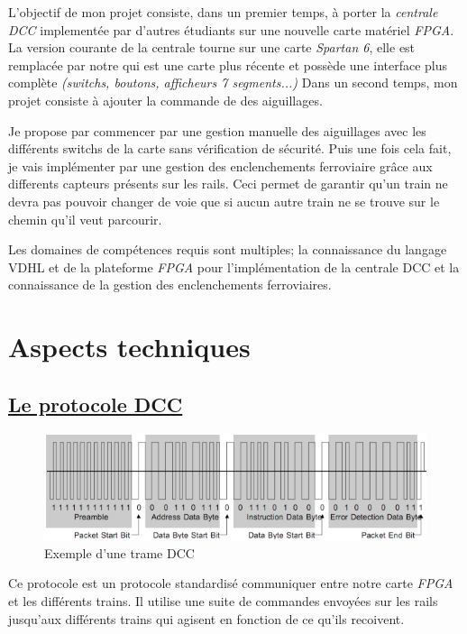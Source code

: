 L'objectif de mon projet consiste, dans un premier temps, à porter la
\emph{centrale DCC} implement\'ee par d'autres \'etudiants sur une nouvelle
carte mat\'eriel \emph{FPGA}. La version courante de la centrale tourne sur
une carte \emph{Spartan 6}, elle est remplac\'ee par notre \crt qui est
une carte plus r\'ecente et possède une interface plus complète
\emph{(switchs, boutons, afficheurs 7 segments...)}
Dans un second temps, mon projet consiste à ajouter la commande de
des aiguillages.

Je propose par commencer par une gestion manuelle des aiguillages avec
les diff\'erents switchs de la carte sans v\'erification de s\'ecurit\'e. Puis
une fois cela fait, je vais impl\'ementer par une gestion des
enclenchements ferroviaire grâce aux differents capteurs pr\'esents sur
les rails. Ceci permet de garantir qu'un train ne devra pas pouvoir
changer de voie que si aucun autre train ne se trouve sur le chemin
qu'il veut parcourir. 

Les domaines de comp\'etences requis sont multiples; la connaissance
du langage VDHL et de la plateforme \emph{FPGA} pour l'impl\'ementation
de la centrale DCC et la connaissance de la gestion des enclenchements
ferroviaires.


\newpage
\section{Aspects techniques}
\label{sec:asp_tech}

\subsection{\underline{ Le protocole DCC}}
\label{sec:dcc}


\begin{figure}[ht]
\centering
\includegraphics[scale=0.75]{trame.png}
\caption{Exemple d'une trame DCC}
\label{fig1}
\end{figure}


Ce protocole est un protocole standardis\'e  communiquer entre notre carte
\emph{FPGA} et les diff\'erents trains. Il utilise une suite de commandes envoy\'ees sur les rails  
jusqu'aux diff\'erents trains qui agisent en fonction de ce qu'ils recoivent.

